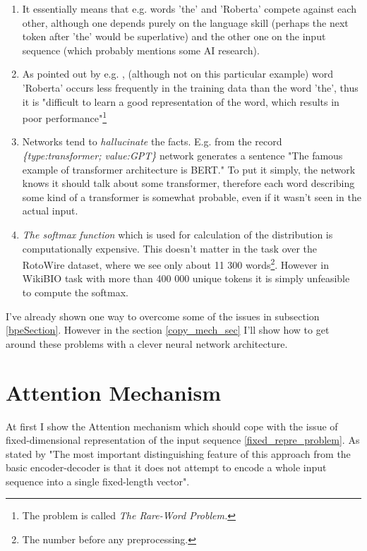 \begin{enumerate}
    \item It essentially means that e.g. words 'the' and 'Roberta' compete against each other, although one depends purely on the language skill (perhaps the next token after 'the' would be superlative) and the other one on the input sequence (which probably mentions some AI research).
    \item As pointed out by e.g. \citep{gulcehre2016pointing}, (although not on this particular example) word 'Roberta' occurs less frequently in the training data than the word 'the', thus it is "difficult to learn a good representation of the word, which results in poor performance"\footnote{The problem is called \emph{The Rare-Word Problem.}}
    \item Networks tend to \emph{hallucinate} the facts. E.g. from the record \emph{\{type:transfor\-mer; value:GPT\}} network generates a sentence "The famous example of transformer architecture is BERT." To put it simply, the network knows it should talk about some transformer, therefore each word describing some kind of a transformer is somewhat probable, even if it wasn't seen in the actual input.
    \item \emph{The softmax function} which is used for calculation of the distribution is computationally expensive. This doesn't matter in the task over the RotoWire dataset, where we see only about 11 300 words\footnote{The number before any preprocessing.}. However in WikiBIO task with more than 400 000 unique tokens it is simply unfeasible to compute the softmax.
\end{enumerate}

I've already shown one way to overcome some of the issues in subsection \ref{bpeSection}. However in the section \ref{copy_mech_sec} I'll show how to get around these problems with a clever neural network architecture.

\section{Attention Mechanism}

At first I show the Attention mechanism which should cope with the issue of fixed-dimensional representation of the input sequence \ref{fixed_repre_problem}. As stated by \citep{bahdanau2016neural} "The most important distinguishing feature of this approach from the basic encoder-decoder is that it does not attempt to encode a whole input sequence into a single fixed-length vector".

